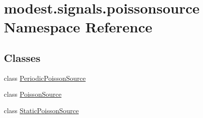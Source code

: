 \hypertarget{namespacemodest_1_1signals_1_1poissonsource}{}\section{modest.\+signals.\+poissonsource Namespace Reference}
\label{namespacemodest_1_1signals_1_1poissonsource}
\subsection*{Classes}
\begin{DoxyCompactItemize}
\item 
class \hyperlink{classmodest_1_1signals_1_1poissonsource_1_1PeriodicPoissonSource}{Periodic\+Poisson\+Source}
\item 
class \hyperlink{classmodest_1_1signals_1_1poissonsource_1_1PoissonSource}{Poisson\+Source}
\item 
class \hyperlink{classmodest_1_1signals_1_1poissonsource_1_1StaticPoissonSource}{Static\+Poisson\+Source}
\end{DoxyCompactItemize}
